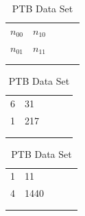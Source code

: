 \documentclass{ieeeaccess}
\begin{document}
\begin{table}[ht]
    \caption{McNemar's Contingency Tables}
    \label{tab:temps}
    \begin{subtable}[t]{.3\linewidth}
        \centering
        \begin{tabular}{lllll}
            \cline{1-2}
            \multicolumn{1}{|l|}{$n_{00}$}  & \multicolumn{1}{l|}{$n_{10}$} & &  &  \\ \cline{1-2}
            \multicolumn{1}{|l|}{$n_{01}$}  & \multicolumn{1}{l|}{$n_{11}$} & &  \\ \cline{1-2}
                                            &                               &  &  &  \\
                                            &                               &  &  & 
        \end{tabular}
        \caption{Layout\hspace*{\fill}}
        \label{tbl:mcnemar}
    \end{subtable}%
    \hfil
    \begin{subtable}[t]{.3\linewidth}
        \centering
        \begin{tabular}{lllll}
            \cline{1-2}
            \multicolumn{1}{|l|}{6}   & \multicolumn{1}{l|}{31}   & &  &  \\ \cline{1-2}
            \multicolumn{1}{|l|}{1}     & \multicolumn{1}{l|}{217}    & &  \\ \cline{1-2}
                                        &                           &  &  &  \\
                                        &                           &  &  & 
        \end{tabular}
        \caption{ECG Data Set\hspace*{\fill}}
        \label{tbl:mcnemarECGfall}
     \end{subtable}%
     \hfil
    \begin{subtable}[t]{.3\linewidth}
        \centering
        \begin{tabular}{lllll}
            \cline{1-2}
                \multicolumn{1}{|l|}{1}  & \multicolumn{1}{l|}{11}   & &  &  \\ \cline{1-2}
                \multicolumn{1}{|l|}{4}     & \multicolumn{1}{l|}{1440}    & &  \\ \cline{1-2}
                                            &                           &  &  &  \\
                                            &                           &  &  & 
        \end{tabular}
        \caption{PTB Data Set\hspace*{\fill}}
        \label{tbl:mcnemarPTB}
    \end{subtable}%
\end{table}
\end{document}
